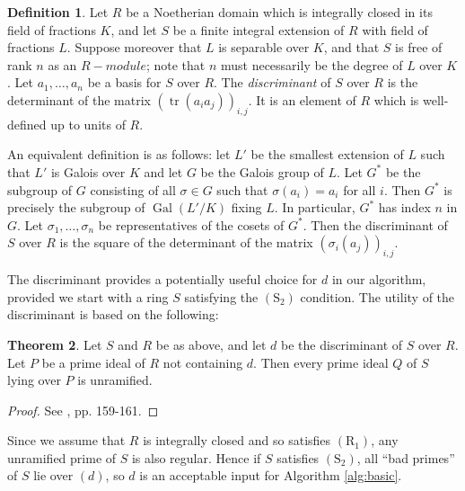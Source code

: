 \documentclass{amsart}
\theoremstyle{definition}
\newtheorem{theorem}{Theorem}
\newtheorem{definition}[theorem]{Definition}
\DeclareMathOperator{\tr}{tr}
\DeclareMathOperator{\Gal}{Gal}
\newcommand{\Rone}{(\text{R}_1)}
\newcommand{\Stwo}{(\text{S}_2)}
\begin{document}
\begin{definition}
Let $R$ be a Noetherian domain which is integrally closed in its field of fractions $K$, and let $S$ be a finite integral extension of $R$ with field of fractions $L$.  Suppose moreover that $L$ is separable over $K$, and that $S$ is free of rank $n$ as an $R-module$; note that $n$ must necessarily be the degree of $L$ over $K$.  Let $a_1, \ldots, a_n$ be a basis for $S$ over $R$.  The \emph{discriminant} of $S$ over $R$ is the determinant of the matrix $(\tr (a_ia_j))_{i,j}$.  It is an element of $R$ which is well-defined up to units of $R$.

An equivalent definition is as follows: let $L'$ be the smallest extension of $L$ such that $L'$ is Galois over $K$ and let $G$ be the Galois group of $L$.  Let $G^*$ be the subgroup of $G$ consisting of all $\sigma \in G$ such that $\sigma(a_i) = a_i$ for all $i$.  Then $G^*$ is precisely the subgroup of $\Gal(L'/K)$ fixing $L$.  In particular, $G^*$ has index $n$ in $G$.  Let $\sigma_1, \ldots, \sigma_n$ be representatives of the cosets of $G^*$.  Then the discriminant of $S$ over $R$ is the square of the determinant of the matrix $(\sigma_i(a_j))_{i,j}$.
\end{definition}

The discriminant provides a potentially useful choice for $d$ in our algorithm, provided we start with a ring $S$ satisfying the $\Stwo$ condition.  The utility of the discriminant is based on the following:
\begin{theorem}\label{thm:disc}
Let $S$ and $R$ be as above, and let $d$ be the discriminant of $S$ over $R$.  Let $P$ be a prime ideal of $R$ not containing $d$.  Then every prime ideal $Q$ of $S$ lying over $P$ is unramified.
\end{theorem}
\begin{proof}
See \cite{Na}, pp. 159-161.  %
\end{proof}

Since we assume that $R$ is integrally closed and so satisfies $\Rone$, any unramified prime of $S$ is also regular.  Hence if $S$ satisfies $\Stwo$, all ``bad primes'' of $S$ lie over $(d)$, so $d$ is an acceptable input for Algorithm \ref{alg:basic}.
\end{document}
